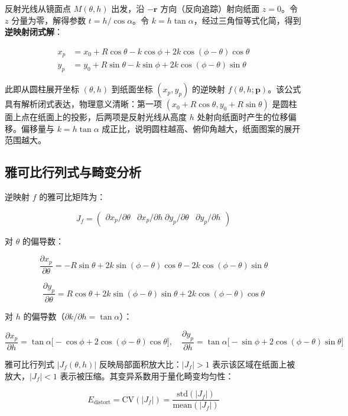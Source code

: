 反射光线从镜面点 $M(\theta, h)$ 出发，沿 $-\boldsymbol{r}$ 方向（反向追踪）射向纸面 $z=0$。令 $z$ 分量为零，解得参数 $t = h/\cos\alpha$。令 $k = h\tan\alpha$，经过三角恒等式化简，得到\textbf{逆映射闭式解}：

$$
\boxed{
\begin{aligned}
x_p &= x_0 + R\cos\theta - k\cos\phi + 2k\cos(\phi-\theta)\cos\theta\\
y_p &= y_0 + R\sin\theta - k\sin\phi + 2k\cos(\phi-\theta)\sin\theta
\end{aligned}
}
$$

此即从圆柱展开坐标 $(\theta, h)$ 到纸面坐标 $(x_p, y_p)$ 的逆映射 $f(\theta, h; \boldsymbol{p})$。该公式具有解析闭式表达，物理意义清晰：第一项 $(x_0 + R\cos\theta, y_0 + R\sin\theta)$ 是圆柱面上点在纸面上的投影，后两项是反射光线从高度 $h$ 处射向纸面时产生的位移偏移。偏移量与 $k = h\tan\alpha$ 成正比，说明圆柱越高、俯仰角越大，纸面图案的展开范围越大。

\subsection{雅可比行列式与畸变分析}

逆映射 $f$ 的雅可比矩阵为：

$$
J_f = \begin{pmatrix} \partial x_p/\partial\theta & \partial x_p/\partial h \ \partial y_p/\partial\theta & \partial y_p/\partial h \end{pmatrix}
$$

对 $\theta$ 的偏导数：

$$
\frac{\partial x_p}{\partial\theta} = -R\sin\theta + 2k\sin(\phi-\theta)\cos\theta - 2k\cos(\phi-\theta)\sin\theta
$$

$$
\frac{\partial y_p}{\partial\theta} = R\cos\theta + 2k\sin(\phi-\theta)\sin\theta + 2k\cos(\phi-\theta)\cos\theta
$$

对 $h$ 的偏导数（$\partial k/\partial h = \tan\alpha$）：

$$
\frac{\partial x_p}{\partial h} = \tan\alpha\bigl[-\cos\phi + 2\cos(\phi-\theta)\cos\theta\bigr], \quad
\frac{\partial y_p}{\partial h} = \tan\alpha\bigl[-\sin\phi + 2\cos(\phi-\theta)\sin\theta\bigr]
$$

雅可比行列式 $|J_f(\theta,h)|$ 反映局部面积放大比：$|J_f| > 1$ 表示该区域在纸面上被放大，$|J_f| < 1$ 表示被压缩。其变异系数用于量化畸变均匀性：

$$
E_{\text{distort}} = \text{CV}(|J_f|) = \frac{\text{std}(|J_f|)}{\text{mean}(|J_f|)}
$$

